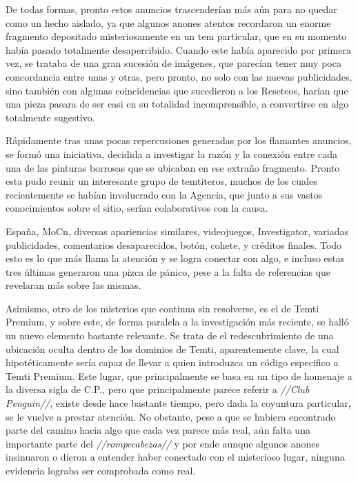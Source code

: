 \documentclass[
  spanish,
]{book}
\begin{document}
De todas formas, pronto estos anuncios trascenderían más aún para no quedar como un hecho aislado, ya que algunos anones atentos recordaron un enorme fragmento depositado misteriosamente en un tem particular, que en su momento había pasado totalmente desapercibido.
Cuando este había aparecido por primera vez, se trataba de una gran sucesión de imágenes, que parecían tener muy poca concordancia entre unas y otras, pero pronto, no solo con las nuevas publicidades, sino también con algunas coincidencias que sucedieron a los Reseteos, harían que una pieza pasara de ser casi en su totalidad incomprensible, a convertirse en algo totalmente sugestivo.

Rápidamente tras unas pocas repercusiones generadas por los flamantes anuncios, se formó una iniciativa, decidida a investigar la razón y la conexión entre cada una de las pinturas borrosas que se ubicaban en ese extraño fragmento.
Pronto esta pudo reunir un interesante grupo de temtiteros, muchos de los cuales recientemente se habían involucrado con la Agencia, que junto a sus vastos conocimientos sobre el sitio, serían colaborativos con la causa.

España, MoCn, diversas apariencias similares, videojuegos, Investigator, variadas publicidades, comentarios desaparecidos, botón, cohete, y créditos finales.
Todo esto es lo que más llama la atención y se logra conectar con algo, e incluso estas tres últimas generaron una pizca de pánico, pese a la falta de referencias que revelaran más sobre las mismas.

Asimismo, otro de los misterios que continua sin resolverse, es el de Temti Premium, y sobre este, de forma paralela a la investigación más reciente, se halló un nuevo elemento bastante relevante. Se trata de el redescubrimiento de una ubicación oculta dentro de los dominios de Temti, aparentemente clave, la cual hipotéticamente sería capaz de llevar a quien introduzca un código especifico a Temti Premium.
Este lugar, que principalmente se basa en un tipo de homenaje a la diversa sigla de C.P., pero que principalmente parece referir a \emph{//Club Penguin//}, existe desde hace bastante tiempo, pero dada la coyuntura particular, se le vuelve a prestar atención. No obstante, pese a que se hubiera encontrado parte del camino hacia algo que cada vez parece más real, aún falta una importante parte del \emph{//rompecabezas//} y por ende aunque algunos anones insinuaron o dieron a entender haber conectado con el misterioso lugar, ninguna evidencia lograba ser comprobada como real.
\end{document}

